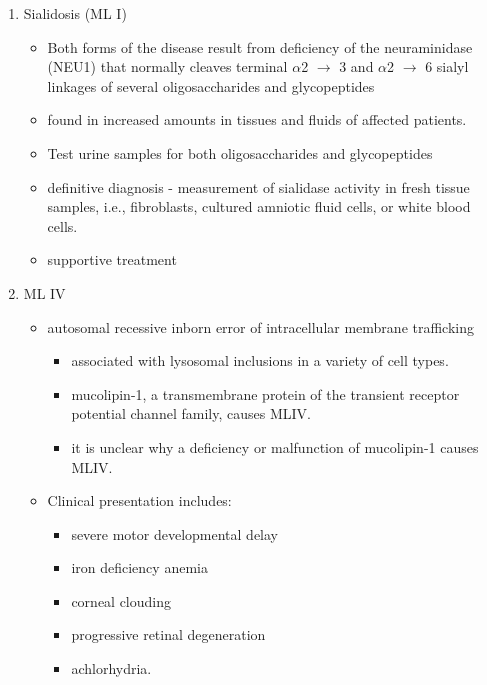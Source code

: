 \documentclass{scrartcl}
\begin{document}
\begin{enumerate}
\item Sialidosis (ML I)
\label{sec:org9576353}

\begin{itemize}
\item Both forms of the disease result from deficiency of the
neuraminidase (NEU1) that normally cleaves terminal \(\alpha\)2 \(\to\) 3 and
\(\alpha\)2 \(\to\) 6 sialyl linkages of several oligosaccharides and glycopeptides

\item found in increased amounts in tissues and fluids of affected patients.

\item Test urine samples for both oligosaccharides and glycopeptides

\item definitive diagnosis - measurement of sialidase activity in fresh tissue
samples, i.e., fibroblasts, cultured amniotic fluid cells, or white
blood cells.

\item supportive treatment
\end{itemize}

\item ML IV
\label{sec:org8436690}

\begin{itemize}
\item autosomal recessive inborn error of intracellular membrane trafficking
\begin{itemize}
\item associated with lysosomal inclusions in a variety of cell types.
\item mucolipin-1, a transmembrane protein of the transient receptor
potential channel family, causes MLIV.
\item it is unclear why a deficiency or malfunction of mucolipin-1 causes MLIV.
\end{itemize}

\item Clinical presentation includes:
\begin{itemize}
\item severe motor developmental delay
\item iron deficiency anemia
\item corneal clouding
\item progressive retinal degeneration
\item achlorhydria.
\end{itemize}


\end{itemize}
\end{enumerate}
\end{document}
